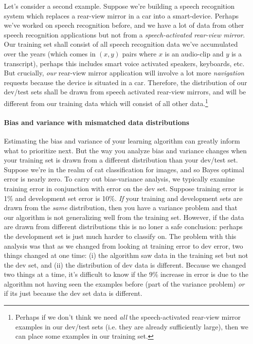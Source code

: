 \documentclass[12pt]{article}
\begin{document}
Let's consider a second example. Suppose we're building a speech recognition system which replaces a rear-view mirror in a car into
a smart-device. Perhaps we've worked on speech recognition before, and we have a lot of data from other speech recognition applications but not from a \emph{speech-activated rear-view mirror}. Our training set shall consist of all speech recognition data we've
accumulated over the years (which comes in $(x,y)$ pairs where $x$ is an audio-clip and $y$ is a transcript), perhaps this includes
smart voice activated speakers, keyboards, etc. But crucially, \emph{our} rear-view mirror application will involve a lot more
\emph{navigation} requests because the device is situated in a car. Therefore, 
the distribution of our dev/test sets shall be drawn from speech activated rear-view mirrors, and will be different from our 
training data which will consist of all other data.\footnote{Perhaps if we don't think we need \emph{all} the speech-activated rear-view mirror examples in our dev/test sets (i.e. they are already sufficiently large), then we can place some examples in our training set.}

\paragraph{Bias and variance with mismatched data distributions} Estimating the bias and variance of your learning algorithm
can greatly inform what to prioritize next. But the way you analyze bias and variance changes when your training set is drawn from a different distribution than your dev/test set. Suppose we're in the realm of cat classification for images, and so Bayes optimal error is nearly zero. To carry out bias-variance analysis, we typically examine training error in conjunction with error on the dev set. Suppose training error is 1\% and development set error is 10\%. \emph{If} your training and development sets are drawn from the \emph{same} distribution, then you have a variance problem and that our algorithm is not generalizing well from the training set. However, if the data are drawn from different distributions this is no loner a safe conclusion: perhaps the development set is just much harder to classify on. The problem with this analysis was that as we changed from looking at training error to dev error, two things changed at one time: (i) the algorithm saw data in the training set but not the dev set, and (ii) the distribution of dev data 
is different. Because we changed two things at a time, it's difficult to know if the 9\% increase in error is due to the algorithm
not having seen the examples before (part of the variance problem) \emph{or} if its just because the dev set data is different.
\end{document}
